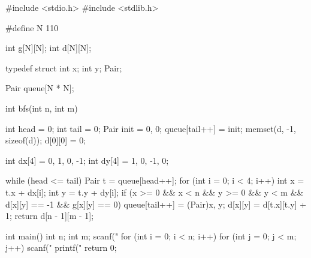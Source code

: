 \begin{mycpptwocol}
#include <stdio.h>
#include <stdlib.h>

#define N 110

int g[N][N];
int d[N][N];

typedef struct {
    int x;
    int y;
} Pair;

Pair queue[N * N];

int bfs(int n, int m)
{
    int head = 0;
    int tail = 0;
    Pair init = {0, 0};
    queue[tail++] = init;
    memset(d, -1, sizeof(d));
    d[0][0] = 0;
    
    int dx[4] = {0, 1, 0, -1};
    int dy[4] = {1, 0, -1, 0};
    
    while (head <= tail) {
        Pair t = queue[head++];
        for (int i = 0; i < 4; i++) {
            int x = t.x + dx[i];
            int y = t.y + dy[i];
            if (x >= 0 && x < n && y >= 0 && y < m && d[x][y] == -1 && g[x][y] == 0) {
                queue[tail++] = (Pair){x, y};
                d[x][y] = d[t.x][t.y] + 1;
            }
        }
    }
    return d[n - 1][m - 1];
}

int main()
{
    int n;
    int m;
    scanf("%
    for (int i = 0; i < n; i++) {
        for (int j = 0; j < m; j++) {
            scanf("%
        }
    }
    printf("%
    return 0;
}
\end{mycpptwocol}

